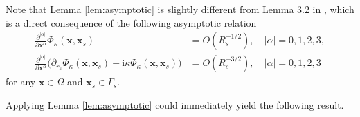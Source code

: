 \documentclass[10pt,a4paper]{article}
\numberwithin{equation}{section}
\begin{document}
 Note that Lemma \ref{lem:asymptotic} is slightly different from Lemma 3.2 in \cite{chen_reverse_2013}, which is a direct consequence of the following asymptotic relation
 \begin{align}
   \label{eq:highorderradiation-1}
   \frac{\partial^{|\alpha|}}{\partial \bm{ x }^{\alpha}} \Phi_{\kappa}(\bm{ x },\bm{ x }_s) &= O \left( R_s^{-1/2} \right), \quad|\alpha|=0,1,2,3,\\
    \label{eq:highorderradiation-2}
   \frac{\partial^{|\alpha|}}{\partial \bm{ x }^{\alpha}}\big(
   \partial_{r_s} \Phi_{\kappa}(\bm{ x },\bm{ x }_s) 
   -\mathrm{ i } \kappa \Phi_{\kappa}(\bm{ x },\bm{ x }_s)\big) &= O \left( R_s^{-3/2} \right), \quad
   |\alpha|=0,1,2,3
 \end{align}
for any $\bm{ x }\in \Omega$ and  $\bm{ x }_s\in \Gamma_s$.

Applying Lemma \ref{lem:asymptotic} could immediately yield the following result.
\end{document}
